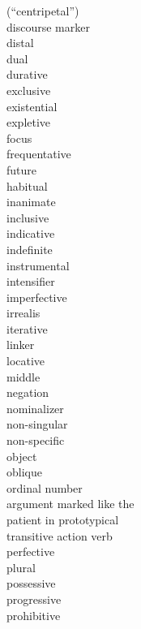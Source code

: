 \begin{multicols}{2}
\begin{tabbing}
			\>  (``centripetal”)\\ 
 \> discourse marker\\ 
 \> distal\\ 
 \> dual\\ 
 \> durative\\ 
 \> exclusive\\ 
 \> existential\\ 
 \> expletive\\ 
 \> focus\\ 
 \> frequentative\\ 
 \> future\\ 
 \> habitual\\ 
 \> inanimate\\ 
 \> inclusive\\ 
 \> indicative\\ 
 \> indefinite\\ 
 \> instrumental\\ 
 \> intensifier\\ 
 \> imperfective\\ 
 \> irrealis\\ 
 \> iterative\\ 
 \> linker\\
 \> locative\\ 
 \> middle\\ 
  \> negation\\ 
 \> nominalizer\\ 
   \> non-singular\\ 
 \> non-specific\\ 
   \> object\\ 
   \> oblique\\ 
   \> ordinal number\\ 
        \> argument marked like the \\
              \> patient in prototypical \\
              \> transitive action verb\\ 
      \> perfective\\ 
       \> plural\\ 
     \> possessive\\ 
     \> progressive\\ 
     \> prohibitive\\ 

\end{tabbing}
\end{multicols}
